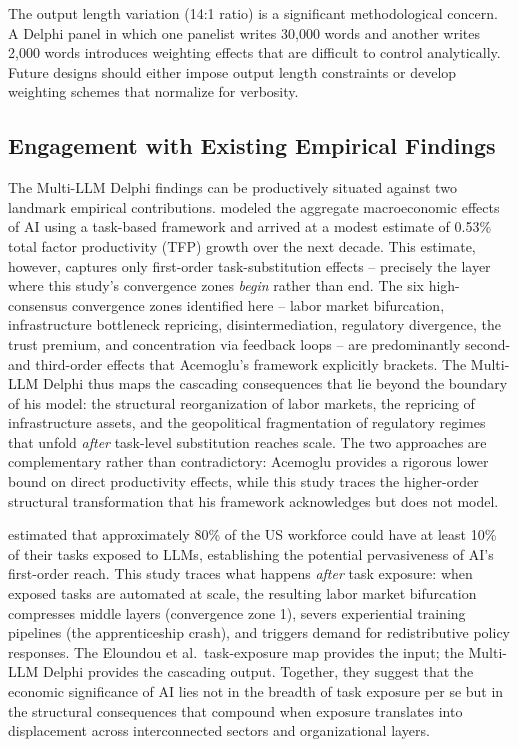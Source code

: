 \documentclass[preprint,review,12pt]{elsarticle}
\begin{document}
The output length variation (14:1 ratio) is a significant methodological concern. A Delphi panel in which one panelist writes 30,000 words and another writes 2,000 words introduces weighting effects that are difficult to control analytically. Future designs should either impose output length constraints or develop weighting schemes that normalize for verbosity.


\subsection{Engagement with Existing Empirical Findings}
\label{sec:empirical_engagement}

The Multi-LLM Delphi findings can be productively situated against two landmark empirical contributions. \citet{acemoglu2024simplemacro} modeled the aggregate macroeconomic effects of AI using a task-based framework and arrived at a modest estimate of 0.53\% total factor productivity (TFP) growth over the next decade. This estimate, however, captures only first-order task-substitution effects -- precisely the layer where this study's convergence zones \textit{begin} rather than end. The six high-consensus convergence zones identified here -- labor market bifurcation, infrastructure bottleneck repricing, disintermediation, regulatory divergence, the trust premium, and concentration via feedback loops -- are predominantly second- and third-order effects that Acemoglu's framework explicitly brackets. The Multi-LLM Delphi thus maps the cascading consequences that lie beyond the boundary of his model: the structural reorganization of labor markets, the repricing of infrastructure assets, and the geopolitical fragmentation of regulatory regimes that unfold \textit{after} task-level substitution reaches scale. The two approaches are complementary rather than contradictory: Acemoglu provides a rigorous lower bound on direct productivity effects, while this study traces the higher-order structural transformation that his framework acknowledges but does not model.

\citet{eloundou2023gpts} estimated that approximately 80\% of the US workforce could have at least 10\% of their tasks exposed to LLMs, establishing the potential pervasiveness of AI's first-order reach. This study traces what happens \textit{after} task exposure: when exposed tasks are automated at scale, the resulting labor market bifurcation compresses middle layers (convergence zone 1), severs experiential training pipelines (the apprenticeship crash), and triggers demand for redistributive policy responses. The Eloundou et al.\ task-exposure map provides the input; the Multi-LLM Delphi provides the cascading output. Together, they suggest that the economic significance of AI lies not in the breadth of task exposure per se but in the structural consequences that compound when exposure translates into displacement across interconnected sectors and organizational layers.
\end{document}
